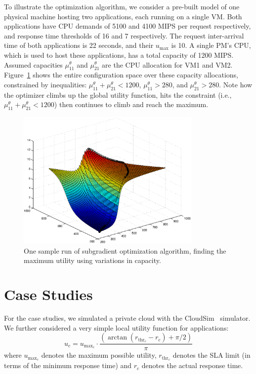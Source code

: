 To illustrate the optimization algorithm, we consider a pre-built model of one physical machine hosting two applications, each running on a single VM. Both applications have CPU demands of 5100 and 4100 MIPS per request respectively, and response time thresholds of 16 and 7 respectively. The request inter-arrival time of both applications is 22 seconds, and their $u_{\text{max}}$ is 10.  A single PM's CPU, which is used to host these applications, has a total capacity of 1200 MIPS.
 Assumed capacities $\mu^\theta_{11}$ and $\mu^\theta_{21}$ are the CPU allocation for VM1 and VM2. Figure~\ref{fig:sample-config-space-for-subgradient-optimization} shows the entire configuration space over these capacity allocations, constrained by inequalities:
 $\mu^\theta_{11}+\mu^\theta_{21}<1200$, $\mu^\theta_{11}>280$, and $\mu^\theta_{21}>280$.
Note how the optimizer climbs up the global utility function, hits the
constraint (i.e., $\mu^\theta_{11}+\mu^\theta_{21}<1200$) then continues to climb and reach the maximum.

\begin{figure}[h]
	\centering
		\includegraphics[width=0.8\textwidth]{image/centralized1/twoVM_1PM_optimality}
		\caption{One sample run of subgradient optimization algorithm, finding the
		maximum utility using variations in capacity.}   
	\label{fig:sample-config-space-for-subgradient-optimization}
\end{figure} 


\section{Case Studies}
\label{sec:case-studies}
For the case studies, we simulated a private cloud with the CloudSim~\cite{CLOUDSIM2010} simulator. 
We further considered a very simple local utility function for applications:
\begin{equation} \label{eq:local-utility-formula}
u_c = u_{{\text{max}}_c}\cdot\frac{\left(\arctan(r_{\text{thr}_c}-r_c)+ \pi/2\right)}{\pi} 
\end{equation}
where $u_{{\text{max}}_c}$ denotes the maximum possible utility, $r_{\text{thr}_c}$ denotes the SLA limit (in terms of the minimum response time) and
$r_c$ denotes the actual response time.

